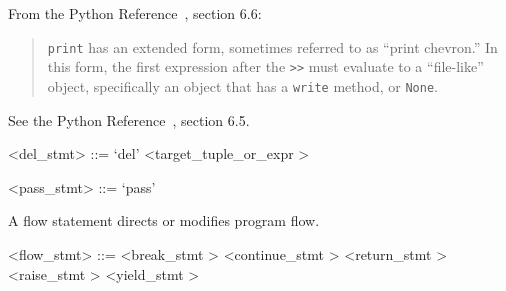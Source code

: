 From the Python Reference~\cite{pythonlang}, section 6.6:
\begin{quote}
\verb|print| has an extended form, sometimes referred to as ``print chevron.'' 
In this form, the first expression after the \verb+>>+ must evaluate to a ``file-like'' 
object, specifically an object that has a \verb|write| method, or \verb|None|.
\end{quote}

\label{delzzzstmtb}
See the Python Reference~\cite{pythonlang}, section 6.5.

\begin{grammar}
<del_stmt> ::= `del' <target_tuple_or_expr \myref[targetzzztuplezzzorzzzexprb]>
\end{grammar}


\label{passzzzstmtb}

\begin{grammar}
<pass_stmt> ::= `pass'
\end{grammar}


\label{flowzzzstmtb}
A flow statement directs or modifies program flow. \\

\begin{grammar}
<flow_stmt> ::= <break_stmt \myref[breakzzzstmtb]>
	\alt <continue_stmt \myref[continuezzzstmtb]>
	\alt <return_stmt \myref[returnzzzstmtb]>
	\alt <raise_stmt \myref[raisezzzstmtb]>
	\alt <yield_stmt \myref[yieldzzzstmtb]>
\end{grammar}



